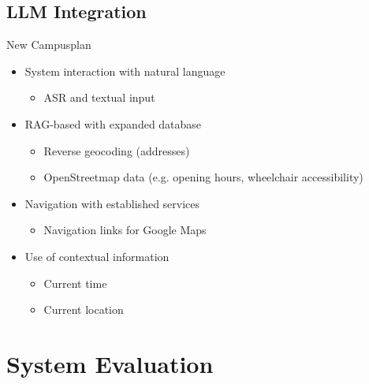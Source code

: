 \documentclass{sdqbeamer}[smallfoot]
\begin{document}
\subsection{LLM Integration}
\begin{frame}[picture vertical=57,picture=images/ui_screenshot,kitlogo=black]{New Campusplan}
    \begin{itemize}
        \item System interaction with natural language
            \begin{itemize}
                \item ASR and textual input
            \end{itemize}
        \item RAG-based with expanded database
            \begin{itemize}
                \item Reverse geocoding (addresses)
                \item OpenStreetmap data (e.g. opening hours, wheelchair accessibility)
            \end{itemize}
        \item Navigation with established services
            \begin{itemize}
                \item Navigation links for Google Maps
            \end{itemize}
        \item Use of contextual information
            \begin{itemize}
                \item Current time
                \item Current location
            \end{itemize}
    \end{itemize}
\end{frame}

\section{System Evaluation}
\end{document}
